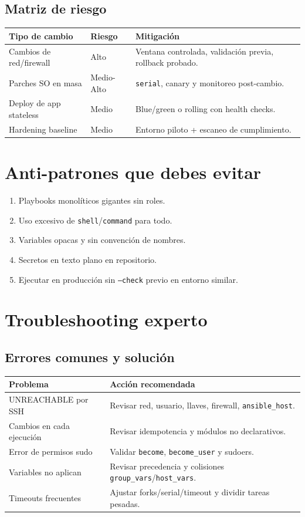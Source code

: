 \documentclass[12pt,a4paper]{article}
\begin{document}
\subsection{Matriz de riesgo}
\begin{longtable}{p{} p{} p{}}
\toprule
\textbf{Tipo de cambio} & \textbf{Riesgo} & \textbf{Mitigación} \\
\midrule
Cambios de red/firewall & Alto & Ventana controlada, validación previa, rollback probado. \\
Parches SO en masa & Medio-Alto & \texttt{serial}, canary y monitoreo post-cambio. \\
Deploy de app stateless & Medio & Blue/green o rolling con health checks. \\
Hardening baseline & Medio & Entorno piloto + escaneo de cumplimiento. \\
\bottomrule
\end{longtable}

\section{Anti-patrones que debes evitar}

\begin{enumerate}
  \item Playbooks monolíticos gigantes sin roles.
  \item Uso excesivo de \texttt{shell}/\texttt{command} para todo.
  \item Variables opacas y sin convención de nombres.
  \item Secretos en texto plano en repositorio.
  \item Ejecutar en producción sin \texttt{--check} previo en entorno similar.
\end{enumerate}

\section{Troubleshooting experto}

\subsection{Errores comunes y solución}
\begin{longtable}{p{} p{}}
\toprule
\textbf{Problema} & \textbf{Acción recomendada} \\
\midrule
UNREACHABLE por SSH & Revisar red, usuario, llaves, firewall, \texttt{ansible\_host}. \\
Cambios en cada ejecución & Revisar idempotencia y módulos no declarativos. \\
Error de permisos sudo & Validar \texttt{become}, \texttt{become\_user} y sudoers. \\
Variables no aplican & Revisar precedencia y colisiones \texttt{group\_vars}/\texttt{host\_vars}. \\
Timeouts frecuentes & Ajustar forks/serial/timeout y dividir tareas pesadas. \\
\bottomrule
\end{longtable}
\end{document}
